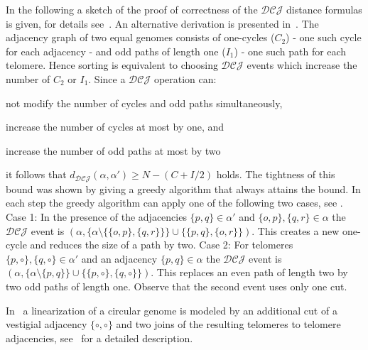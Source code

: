 \documentclass{svmult}
\newcommand{\m}[1]{\mathcal{#1}}
\begin{document}
In the following a sketch of the proof of correctness of the 
$\m{DCJ}$ distance formulas is given, for details see~\cite{Bergeron_2006}. An alternative 
derivation is presented in~\cite{Bergeron_2013}. 
The adjacency graph of two equal genomes consists of one-cycles ($C_2$) - one
such cycle for each adjacency - and odd paths of length one ($I_1$) - one such path for each telomere. 
Hence sorting is equivalent to choosing $\m{DCJ}$ 
events which increase the number of $C_2$ or $I_1$. Since a $\m{DCJ}$ operation can:
\begin{inparaenum}[i)]
	\item not modify the number of cycles and odd paths simultaneously,
	\item increase the number of cycles at most by one, and
	\item increase the number of odd paths at most by two 
\end{inparaenum}
it follows that $d_{\m{DCJ}}(\alpha,\alpha')\geq N-(C+I/2)$ holds. 
% 
The tightness of this bound was shown by giving a greedy algorithm that 
always attains the bound. In each step the greedy algorithm can apply one of the following 
two cases, see . Case 1: In
the presence of the adjacencies $\{p,q\}\in \alpha'$ and $\{o,p\}, \{q,r\}\in \alpha$ the $\m{DCJ}$ event is 
$(\alpha,\{\alpha \setminus	\{\{o,p\},\{q,r\}\}\} \cup \{\{p,q\}, \{o,r\}\})$.
This creates a new one-cycle and reduces the size of a path by
two.
Case 2: For telomeres $\{p,\circ\}, \{q,\circ\}\in \alpha'$ and an adjacency
$\{p,q\} \in \alpha$ the $\m{DCJ}$ event is $(\alpha,\{\alpha \setminus
\{p,q\}\} \cup \{\{p,\circ\},\{q,\circ\}\})$. This replaces an even path of
length two by two odd paths of length one. Observe that the second event uses only one cut.

In~\cite{Bergeron_2006} a linearization of a circular genome is modeled by an additional cut of a vestigial adjacency 
$\{\circ,\circ\}$ and two joins of the resulting telomeres to telomere adjacencies, see~\cite{Friedberg_2008} for a 
detailed description.
\end{document}
